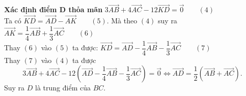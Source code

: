 \begin{vd}
{\begin{listEX}[1]
{
			}
			\item\textbf{Xác định điểm D thỏa mãn} $3\overrightarrow{AB}+4\overrightarrow{AC}-12\overrightarrow{KD}=\overrightarrow{0}\qquad (4)$\\
			Ta có $\overrightarrow{KD}=\overrightarrow{AD}-\overrightarrow{AK}\qquad (5)$. Mà theo $(4)$ suy ra $\overrightarrow{AK}=\dfrac{1}{4}\overrightarrow{AB}+\dfrac{1}{3}\overrightarrow{AC}\qquad (6)$\\
			Thay $(6)$ vào $(5)$ ta được: $\overrightarrow{KD}=\overrightarrow{AD}-\dfrac{1}{4}\overrightarrow{AB}-\dfrac{1}{3}\overrightarrow{AC}\qquad (7)$\\
			Thay $(7)$ vào $(4)$ ta được $$3\overrightarrow{AB}+4\overrightarrow{AC}-12\left(\overrightarrow{AD}-\dfrac{1}{4}\overrightarrow{AB}-\dfrac{1}{3}\overrightarrow{AC}\right) =\overrightarrow{0}\Leftrightarrow \overrightarrow{AD}=\dfrac{1}{2}\left(\overrightarrow{AB}+\overrightarrow{AC}\right).$$
			Suy ra $D$ là trung điểm của $BC$.
		\end{listEX}
	}
\end{vd}
